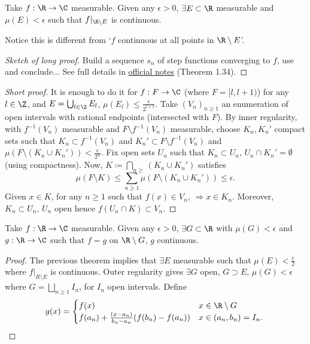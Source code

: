 \documentclass{article}
\begin{document}
\begin{thm}
    Take $f: \R \to \C$ measurable. Given any $\epsilon > 0$, $\exists E \subset \R$ measurable and $\mu(E) < \epsilon$ such that $f|_{\R \setminus E}$ is continuous.
\end{thm}
\begin{remark}
    Notice this is different from `$f$ continuous at all points in $\R \setminus E$'.
\end{remark}
\begin{proof}[Sketch of long proof]
    Build a sequence $s_n$ of step functions converging to $f$, use  and conclude... See full details in \href{https://cmouhot.files.wordpress.com/2017/01/notes-af-v21.pdf}{official notes} (Theorem 1.34).
\end{proof}
\begin{proof}[Short proof]
    It is enough to do it for $f: F \to \C$ (where $F = [l, l+1)$) for any $l \in \Z$, and $E = \bigcup_{l \in \Z} E_l$, $\mu(E_l) \leq \frac{\epsilon}{2^{l+1}}$.
    Take $(V_n)_{n \geq 1}$ an enumeration of open intervals with rational endpoints (intersected with $F$).
    By inner regularity, with $f^{-1}(V_n)$ measurable and $F \setminus f^{-1}(V_n)$ measurable, choose $K_n, K_n'$ compact sets such that $K_n \subset f^{-1}(V_n)$ and $K_n' \subset F\setminus f^{-1}(V_n)$ and $\mu(F \setminus (K_n \cup K_n')) < \frac{\epsilon}{2^n}$.
    Fix open sets $U_n$ such that $K_n \subset U_n$, $U_n \cap K_n' = \emptyset$ (using compactness).
    Now, $K \coloneqq \bigcap_{n \geq } (K_n \cup K_n')$ satisfies
    \begin{equation*}
        \mu(F \setminus K) \leq \sum_{n \geq 1} \mu(F \setminus (K_n \cup K_n')) \leq \epsilon.
    \end{equation*}
    Given $x \in K$, for any $n \geq 1$ such that $f(x) \in V_n$, $\Rightarrow x \in K_n$. Moreover, $K_n \subset U_n$, $U_n$ open hence $f(U_n \cap K) \subset V_n$.
\end{proof}
\begin{thm}
    Take $f: \R \to \C$ measurable. Given any $\epsilon > 0$, $\exists G \subset \R$ with $\mu(G) < \epsilon$ and $g: \R \to \C$ such that $f = g$ on $\R \setminus G$, $g$ continuous.
\end{thm}
\begin{proof}
    The previous theorem implies that $\exists E$ measurable such that $\mu(E) < \frac{\epsilon}{2}$ where $f|_{R \setminus E}$ is continuous.
    Outer regularity gives $\exists G$ open, $G \supset E$, $\mu(G) < \epsilon$ where $G = \bigsqcup_{n \geq 1} I_n$, for $I_n$ open intervals.
    Define
    \begin{equation*}
        g(x) =
        \begin{cases}
            f(x) & x \in \R \setminus G \\
            f(a_n) + \frac{(x-a_n)}{b_n - a_n} (f(b_n) - f(a_n)) & x \in (a_n, b_n)=I_n.
        \end{cases}\qedhere
    \end{equation*}
\end{proof}
\end{document}
